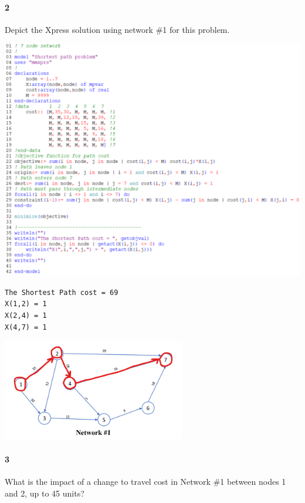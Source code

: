 \documentclass[12pt]{article}
\newenvironment{fullbox}{\begin{lrbox}{\savefullbox}\begin{minipage}{\dimexpr\textwidth-2\fboxsep\relax}}{\end{minipage}\end{lrbox}\begin{center}\framebox[\textwidth]{\usebox{\savefullbox}}\end{center}}
\newenvironment{pbox}[1][]{\begin{fullbox}\ifx#1\empty\else\paragraph{#1}\fi}{\end{fullbox}}
\theoremstyle{definition}
\begin{document}
\begin{pbox}[2]
    Depict the Xpress solution using network \#1 for this problem.
\end{pbox}

\begin{center}
    \includegraphics[width=\textwidth]{code1.png}
\end{center}
\begin{verbatim}
The Shortest Path cost = 69
X(1,2) = 1
X(2,4) = 1
X(4,7) = 1
\end{verbatim}
\begin{center}
    \includegraphics[width=0.6\textwidth]{sol1.png}
\end{center}




\begin{pbox}[3]
    What is the impact of a change to travel cost in Network \#1 between nodes 1 and 2, up to 45 units?
\end{pbox}
\end{document}
